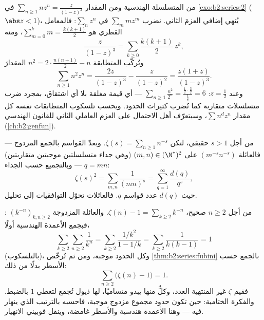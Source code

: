 \begin{example}\label{ex:b2:series:squaresum}
من المتسلسلة الهندسية ومن المقدار $\sum_{n
\geq 1} nz^n = \frac{z}{(1-z)^2}$ في \cref{exo:b2:series:2} ($\abs z < 1$)، يُنهي  إضافي العزمَ الثاني. نضرب $\sum_m
mz^m$ في $\sum_n z^n$: فالمعامل القطري هو $\sum_{m=0}^k
m = \frac{k(k+1)}2$، ومنه
\[
\frac{z}{(1-z)^3} = \sum_{k\geq0}\frac{k(k+1)}{2}\,z^k ,
\]
وتُركّب المتطابقة $n^2 = 2\cdot\frac{n(n+1)}2 - n$ المقدارَ
\[
\sum_{n\geq1} n^2z^n = \frac{2z}{(1-z)^3} - \frac{z}{(1-z)^2}
= \frac{z(1+z)}{(1-z)^3} .
\]
وعند $z = \frac12$: $\sum_{n\geq1}\frac{n^2}{2^n} =
\frac{\frac12\cdot\frac32}{\frac18} = 6$ --- أي قيمة مغلقة بلا
أي اشتقاق، بمجرد ضرب متسلسلات متقاربة 
كما تُضرب كثيرات الحدود. ويحسب تلسكوب المتطابقات نفسه
كل مقدار $\sum n^dz^n$، وسيتعرّف أهل الاحتمال على
العزم العاملي الثاني للقانون الهندسي
(\cref{ch:b2:genfun}).
\end{example}

\begin{example}\label{ex:b2:series:doublesum}
من أجل $s > 1$ حقيقي، لتكن $\zeta(s) = \sum_{n\geq1} n^{-s}$. وبعدّ
القواسم بالجمع المزدوج --- فالعائلة $(m^{-s}n^{-s})$ على
$(m,n) \in (\N^*)^2$  (وهي جداء متسلسلتين موجبتين متقاربتين)
--- وبالتجميع حسب الجداء $q = mn$:
\[
\zeta(s)^2 = \sum_{m,n} \frac{1}{(mn)^s}
= \sum_{q=1}^{\infty} \frac{d(q)}{q^s},
\]
حيث $d(q)$ عدد قواسم $q$. فالعائلات 
تحوّل التوافقيات إلى تحليل.
\end{example}

\begin{example}[تقييم بفوبيني: $\sum_n (\zeta(n) - 1) = 1$]\label{ex:b2:series:zetasum}
من أجل $n \geq 2$ صحيح، $\zeta(n) - 1 = \sum_{k \geq 2} k^{-n}$.
والعائلة المزدوجة $(k^{-n})_{k, n \geq 2}$ : فبجمع
الأعمدة الهندسية أولًا،
\[
\sum_{k\geq2}\sum_{n\geq2} \frac{1}{k^n}
= \sum_{k\geq2} \frac{1/k^2}{1 - 1/k}
= \sum_{k\geq2} \frac{1}{k(k-1)} = 1
\]
(بالتلسكوب)، وكل الحدود موجبة، ومن ثم تُرخّص
\cref{thm:b2:series:fubini} بالجمع حسب الأسطر بدلًا من ذلك:
\[
\sum_{n\geq2}\bigl(\zeta(n) - 1\bigr) = 1 .
\]
فقيم $\zeta$ غير المنتهية العدد، وكلٌّ منها يبدو متساميًا،
لها ذيول تُجمع لتعطي $1$ بالضبط. والفكرة الختامية: حين تكون
حدود مجموع مزدوج موجبة، فاحسبه بالترتيب الذي
ينهار فيه --- وهنا الأعمدة هندسية والأسطر غامضة،
وينقل فوبيني الانهيار.
\end{example}

